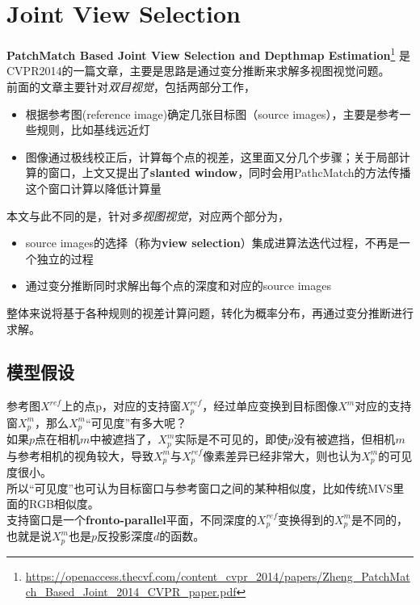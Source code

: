 \section{Joint View Selection}

\textbf{PatchMatch Based Joint View Selection and Depthmap Estimation}\footnote{\url{https://openaccess.thecvf.com/content_cvpr_2014/papers/Zheng_PatchMatch_Based_Joint_2014_CVPR_paper.pdf}} 是CVPR2014的一篇文章，主要是思路是通过变分推断来求解多视图视觉问题。\\


前面的文章主要针对\textit{双目视觉}，包括两部分工作，
\begin{itemize}
	\item 根据参考图(reference image)确定几张目标图（source images），主要是参考一些规则，比如基线远近灯
	\item 图像通过极线校正后，计算每个点的视差，这里面又分几个步骤；关于局部计算的窗口，上文又提出了\textbf{slanted window}，同时会用PathcMatch的方法传播这个窗口计算以降低计算量
\end{itemize}


本文与此不同的是，针对\textit{多视图视觉}，对应两个部分为，
\begin{itemize}
	\item source images的选择（称为\textbf{view selection}）集成进算法迭代过程，不再是一个独立的过程
	\item 通过变分推断同时求解出每个点的深度和对应的source images
\end{itemize}

整体来说将基于各种规则的视差计算问题，转化为概率分布，再通过变分推断进行求解。

\subsection{模型假设}

参考图$X^{ref}$上的点p，对应的支持窗$X_p^{ref}$，经过单应变换到目标图像$X^m$对应的支持窗$X^m_p$，那么$X^m_p$“可见度”有多大呢？\\

如果$p$点在相机$m$中被遮挡了，$X^m_p$实际是不可见的，即使$p$没有被遮挡，但相机$m$与参考相机的视角较大，导致$X^m_p$与$X_p^{ref}$像素差异已经非常大，则也认为$X^m_p$的可见度很小。\\

所以“可见度”也可认为目标窗口与参考窗口之间的某种相似度，比如传统MVS里面的RGB相似度。\\

支持窗口是一个\textbf{fronto-parallel}平面，不同深度的$X_p^{ref}$变换得到的$X^m_p$是不同的，也就是说$X^m_p$也是$p$反投影深度$d$的函数。\\

